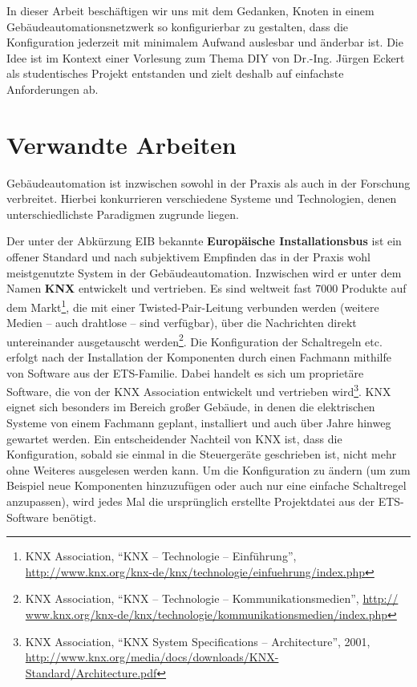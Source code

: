 \documentclass[conference]{IEEEtran}
\begin{document}
    In dieser Arbeit beschäftigen wir uns mit dem Gedanken,
    Knoten in einem Gebäudeautomationsnetzwerk so konfigurierbar zu gestalten,
    dass die Konfiguration jederzeit mit minimalem Aufwand auslesbar
    und änderbar ist.
    Die Idee ist im Kontext einer Vorlesung zum Thema \ac{DIY}
    von Dr.-Ing. Jürgen Eckert als studentisches
    Projekt entstanden und zielt deshalb auf einfachste Anforderungen ab.

\section{Verwandte Arbeiten}
    Gebäudeautomation ist inzwischen sowohl in der Praxis
    als auch in der Forschung verbreitet. Hierbei konkurrieren verschiedene Systeme
    und Technologien, denen unterschiedlichste Paradigmen zugrunde liegen.

    Der unter der Abkürzung EIB bekannte \textbf{Europäische Installationsbus}
    ist ein offener Standard und nach subjektivem Empfinden das in der Praxis
    wohl meistgenutzte System in der Gebäudeautomation.
    Inzwischen wird er unter dem Namen \textbf{KNX} entwickelt und vertrieben.
    Es sind weltweit fast 7000 Produkte auf dem Markt\footnote{KNX Association, \enquote{KNX -- Technologie -- Einführung}, \url{http://www.knx.org/knx-de/knx/technologie/einfuehrung/index.php}},
    die mit einer Twisted-Pair-Leitung verbunden werden
    (weitere Medien -- auch drahtlose -- sind verfügbar),
    über die Nachrichten direkt untereinander ausgetauscht werden\footnote{KNX Association, \enquote{KNX -- Technologie -- Kommunikationsmedien}, \url{http://
www.knx.org/knx-de/knx/technologie/kommunikationsmedien/index.php}}.
    Die Konfiguration der Schaltregeln etc. erfolgt nach der Installation
    der Komponenten durch einen Fachmann mithilfe von Software aus der
    ETS-Familie. Dabei handelt es sich um proprietäre Software,
    die von der KNX Association
    entwickelt und vertrieben wird\footnote{KNX Association,
        \enquote{KNX System Specifications -- Architecture}, 2001,
        \url{http://www.knx.org/media/docs/downloads/KNX-Standard/Architecture.pdf}}.
    KNX eignet sich besonders im Bereich großer Gebäude, in denen die
    elektrischen Systeme von einem Fachmann geplant, installiert und auch über
    Jahre hinweg gewartet werden. Ein entscheidender Nachteil von KNX ist,
    dass die Konfiguration, sobald sie einmal in die Steuergeräte geschrieben
    ist, nicht mehr ohne Weiteres ausgelesen werden kann.
    Um die Konfiguration zu ändern (um zum Beispiel neue Komponenten hinzuzufügen
    oder auch nur eine einfache Schaltregel anzupassen), wird jedes Mal
    die ursprünglich erstellte Projektdatei aus der ETS-Software benötigt.
\end{document}
